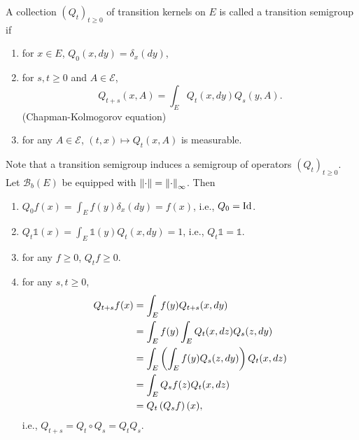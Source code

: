 \begin{defn}
    A collection $(Q_t)_{t \geq 0}$ of transition kernels on $E$ is called a transition semigroup if
    \begin{enumerate}[label=(\roman*)]
        \item for $x \in E$, $Q_0(x,dy) = \delta_x(dy)$,
        \item for $s,t \geq 0$ and $A \in \mathcal{E}$,
        \begin{equation*}
            Q_{t+s}(x,A) = \int_EQ_t(x,dy)Q_s(y,A).
        \end{equation*}
        (Chapman-Kolmogorov equation)
        \item for any $A \in \mathcal{E}$, $(t,x) \mapsto Q_t(x,A)$ is measurable.
    \end{enumerate}
\end{defn}
\begin{rmk}
    Note that a transition semigroup induces a semigroup of operators $(Q_t)_{t \geq 0}$. Let $\mathcal{B}_b(E)$ be equipped with $\left\lVert\cdot\right\lVert = \left\lVert\cdot\right\lVert_\infty$. Then
    \begin{enumerate}[label=(\roman{*})]
        \item $Q_0f(x) = \int_E f(y) \delta_x(dy) = f(x)$, i.e., $Q_0 = \operatorname{Id}$.
        \item $Q_t\mathds{1}(x) = \int_E \mathds{1}(y)Q_t(x,dy) = 1$, i.e., $Q_t \mathds{1} = \mathds{1}$.
        \item for any $f \geq 0$, $Q_tf \geq 0$.
        \item for any $s,t \geq 0 $,
        \begin{align*}
            Q_{t+s}f(x) &= \int_E f(y) Q_{t+s}(x,dy) \\
            &= \int_E f(y) \int_E Q_t(x,dz)Q_s(z,dy) \\
            &= \int_E \left(\int_E f(y) Q_s(z,dy)\right) Q_t(x,dz) \\
            &= \int_E Q_sf(z) Q_t(x,dz) \\
            &= Q_t\left(Q_sf\right)(x),
        \end{align*}
        i.e., $Q_{t+s} = Q_t \circ Q_s = Q_t Q_s$.
    \end{enumerate}
\end{rmk}

